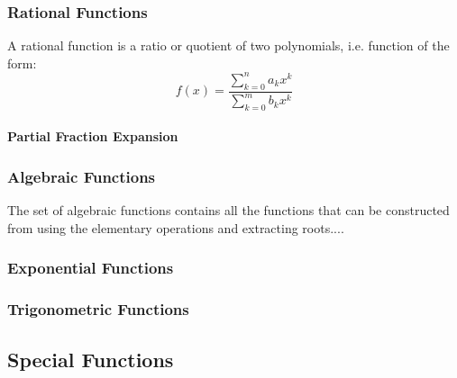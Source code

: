 

\subsubsection{Rational Functions}
A rational function is a ratio or quotient of two polynomials, i.e. function of the form:
\begin{equation}
 f(x) = \frac{\sum_{k=0}^n a_k x^k}{\sum_{k=0}^m b_k x^k}
\end{equation}

\paragraph{Partial Fraction Expansion}



\subsubsection{Algebraic Functions}
The set of algebraic functions contains all the functions that can be constructed from using the elementary operations and extracting roots....

\subsubsection{Exponential Functions}

\subsubsection{Trigonometric Functions}



\subsection{Special Functions}


